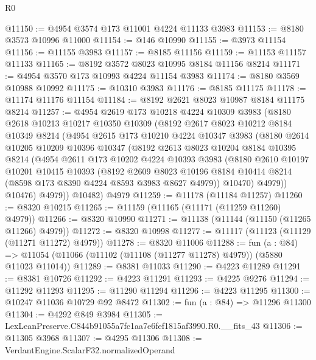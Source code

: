 \begin{lexlean}{R0}
\begin{coremodule}
@11150 := @4954 @3574 @173 @11001 @4224 @11133 @3983
@11153 := @8180 @3573 @10996 @11000
@11154 := @146 @10990
@11155 := @3973 @11154
@11156 := @11155 @3983
@11157 := @8185 @11156
@11159 := @11153 @11157 @11133
@11165 := @8192 @3572 @8023 @10995 @8184 @11156 @8214
@11171 := @4954 @3570 @173 @10993 @4224 @11154 @3983
@11174 := @8180 @3569 @10988 @10992
@11175 := @10310 @3983
@11176 := @8185 @11175
@11178 := @11174 @11176 @11154
@11184 := @8192 @2621 @8023 @10987 @8184 @11175 @8214
@11257 := @4954
    @2619
    @173
    @10218
    @4224
    @10309
    @3983
    (@8180
      @2618
      @10213
      @10217
      @10350
      @10309
      (@8192
        @2617
        @8023
        @10212
        @8184
        @10349
        @8214
        (@4954
          @2615
          @173
          @10210
          @4224
          @10347
          @3983
          (@8180
            @2614
            @10205
            @10209
            @10396
            @10347
            (@8192
              @2613
              @8023
              @10204
              @8184
              @10395
              @8214
              (@4954
                @2611
                @173
                @10202
                @4224
                @10393
                @3983
                (@8180
                  @2610
                  @10197
                  @10201
                  @10415
                  @10393
                  (@8192
                    @2609
                    @8023
                    @10196
                    @8184
                    @10414
                    @8214
                    (@8598 @173 @8390 @4224 @8593 @3983 @8627 @4979))
                  @10470)
                @4979))
            @10476)
          @4979))
      @10482)
    @4979
@11259 := @11178 (@11184 @11257)
@11260 := @8320 @10215
@11265 := @11159 (@11165 (@11171 (@11259 @11260) @4979))
@11266 := @8320 @10990
@11271 := @11138 (@11144 (@11150 (@11265 @11266) @4979))
@11272 := @8320 @10998
@11277 := @11117 (@11123 (@11129 (@11271 @11272) @4979))
@11278 := @8320 @11006
@11288 := fun (a : @84) =>
  @11054 (@11066 (@11102 (@11108 (@11277 @11278) @4979)) (@5880 @11023 @11014))
@11289 := @8381 @11033
@11290 := @4223 @11289
@11291 := @8381 @10726
@11292 := @4223 @11291
@11293 := @4225 @9276
@11294 := @11292 @11293
@11295 := @11290 @11294
@11296 := @4223 @11295
@11300 := @10247 @11036 @10729 @92 @8472
@11302 := fun (a : @84) => @11296 @11300
@11304 := @4292 @849 @3984
@11305 := LexLeanPreserve.C844b91055a7fc1aa7e6fef1815af3990.R0.__fits_43
@11306 := @11305 @3968
@11307 := @4295 @11306
@11308 := VerdantEngine.ScalarF32.normalizedOperand

\end{coremodule}
\end{lexlean}
